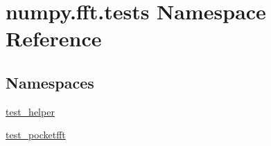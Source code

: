 \hypertarget{namespacenumpy_1_1fft_1_1tests}{}\section{numpy.\+fft.\+tests Namespace Reference}
\label{namespacenumpy_1_1fft_1_1tests}
\subsection*{Namespaces}
\begin{DoxyCompactItemize}
\item 
 \hyperlink{namespacenumpy_1_1fft_1_1tests_1_1test__helper}{test\+\_\+helper}
\item 
 \hyperlink{namespacenumpy_1_1fft_1_1tests_1_1test__pocketfft}{test\+\_\+pocketfft}
\end{DoxyCompactItemize}
